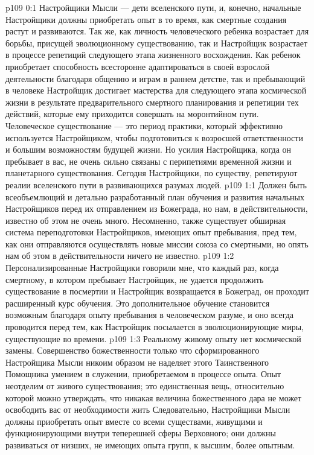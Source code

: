 \author{Одиночный Вестник}
\vs p109 0:1 Настройщики Мысли --- дети вселенского пути, и, конечно, начальные Настройщики должны приобретать опыт в то время, как смертные создания растут и развиваются. Так же, как личность человеческого ребенка возрастает для борьбы, присущей эволюционному существованию, так и Настройщик возрастает в процессе репетиций следующего этапа жизненного восхождения. Как ребенок приобретает способность всесторонне адаптироваться в своей взрослой деятельности благодаря общению и играм в раннем детстве, так и пребывающий в человеке Настройщик достигает мастерства для следующего этапа космической жизни в результате предварительного смертного планирования и репетиции тех действий, которые ему приходится совершать на моронтийном пути. Человеческое существование --- это период практики, который эффективно используется Настройщиком, чтобы подготовиться к возросшей ответственности и большим возможностям будущей жизни. Но усилия Настройщика, когда он пребывает в вас, не очень сильно связаны с перипетиями временной жизни и планетарного существования. Сегодня Настройщики, по существу, репетируют реалии вселенского пути в развивающихся разумах людей.
\vs p109 1:1 Должен быть всеобъемлющий и детально разработанный план обучения и развития начальных Настройщиков перед их отправлением из Божеграда, но нам, в действительности, известно об этом не очень много. Несомненно, также существует обширная система переподготовки Настройщиков, имеющих опыт пребывания, пред тем, как они отправляются осуществлять новые миссии союза со смертными, но опять нам об этом в действительности ничего не известно.
\vs p109 1:2 Персонализированные Настройщики говорили мне, что каждый раз, когда смертному, в котором пребывает Настройщик, не удается продолжить существование в посмертии и Настройщик возвращается в Божеград, он проходит расширенный курс обучения. Это дополнительное обучение становится возможным благодаря опыту пребывания в человеческом разуме, и оно всегда проводится перед тем, как Настройщик посылается в эволюционирующие миры, существующие во времени.
\vs p109 1:3 Реальному живому опыту нет космической замены. Совершенство божественности только что сформированного Настройщика Мысли никоим образом не наделяет этого Таинственного Помощника умением в служении, приобретаемом в процессе опыта. Опыт неотделим от живого существования; это единственная вещь, относительно которой можно утверждать, что никакая величина божественного дара не может освободить вас от необходимости жить  Следовательно, Настройщики Мысли должны приобретать опыт вместе со всеми существами, живущими и функционирующими внутри теперешней сферы Верховного; они должны развиваться от низших, не имеющих опыта групп, к высшим, более опытным.
